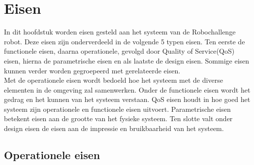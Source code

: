 \documentclass[12pt]{article} %
\begin{document}
\tableofcontents
\newpage
{}
\clearpage

\section{Eisen}
\label{sec:requirements}
In dit hoofdstuk worden eisen gesteld aan het systeem van de Robochallenge robot. Deze eisen zijn onderverdeeld in de volgende 5 typen eisen. Ten eerste de functionele eisen, daarna operationele, gevolgd door Quality of Service(QoS) eisen, hierna de parametrische eisen en als laatste de design eisen. Sommige eisen kunnen verder worden gegroepeerd met gerelateerde eisen.\\
Met de operationele eisen wordt bedoeld hoe het systeem met de diverse elementen in de omgeving zal samenwerken. 
Onder de functionele eisen wordt het gedrag en het kunnen van het systeem verstaan.
QoS eisen houdt in hoe goed het systeem zijn operationele en functionele eisen uitvoert.
Parametrische eisen betekent eisen aan de grootte van het fysieke systeem. 
Ten slotte valt onder design eisen de eisen aan de impressie en bruikbaarheid van het systeem.

\subsection{Operationele eisen}
\end{document}

